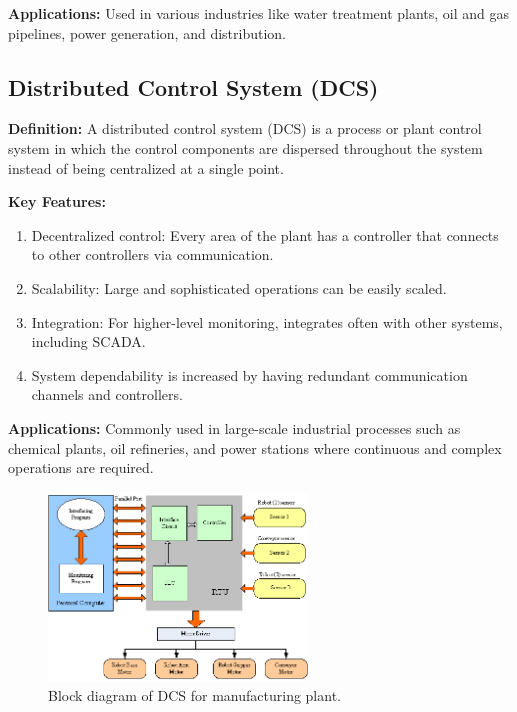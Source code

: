 \textbf{Applications:} Used in various industries like water treatment
plants, oil and gas pipelines, power generation, and distribution.

\subsection{Distributed Control System (DCS)}

\textbf{Definition:} A distributed control system (DCS) is a process or
plant control system in which the control components are dispersed
throughout the system instead of being centralized at a single point.

\textbf{Key Features:}

\begin{enumerate}
\item
  Decentralized control: Every area of the plant has a controller that
  connects to other controllers via communication.
\item
  Scalability: Large and sophisticated operations can be easily scaled.
\item
  Integration: For higher-level monitoring, integrates often with other
  systems, including SCADA.
\item
  System dependability is increased by having redundant communication
  channels and controllers.
\end{enumerate}

\textbf{Applications:} Commonly used in large-scale industrial processes
such as chemical plants, oil refineries, and power stations where
continuous and complex operations are required.




\begin{figure}[h!]
  \centering
  \includegraphics[width=2.704in,height=1.97862in]{figs/control_instrumentation/image11.png}
  \caption{Block diagram of DCS for manufacturing plant.}
  \label{fig:Block diagram of DCS}
\end{figure}
